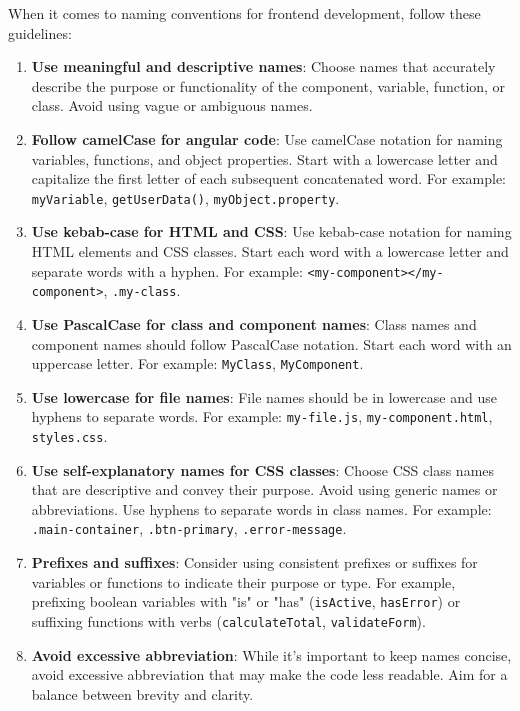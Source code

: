 \documentclass[12pt]{article}
\begin{document}
When it comes to naming conventions for frontend development, follow these guidelines:

\begin{enumerate}
    \item \textbf{Use meaningful and descriptive names}: Choose names that accurately describe the purpose or functionality of the component, variable, function, or class. Avoid using vague or ambiguous names.
    
    \item \textbf{Follow camelCase for angular code}: Use camelCase notation for naming variables, functions, and object properties. Start with a lowercase letter and capitalize the first letter of each subsequent concatenated word. For example: \texttt{myVariable}, \texttt{getUserData()}, \texttt{myObject.property}.
    
    \item \textbf{Use kebab-case for HTML and CSS}: Use kebab-case notation for naming HTML elements and CSS classes. Start each word with a lowercase letter and separate words with a hyphen. For example: \texttt{<my-component></my-component>}, \texttt{.my-class}.

    \item \textbf{Use PascalCase for class and component names}: Class names and component names should follow PascalCase notation. Start each word with an uppercase letter. For example: \texttt{MyClass}, \texttt{MyComponent}.
        
    \item \textbf{Use lowercase for file names}: File names should be in lowercase and use hyphens to separate words. For example: \texttt{my-file.js}, \texttt{my-component.html}, \texttt{styles.css}.
            
    \item \textbf{Use self-explanatory names for CSS classes}: Choose CSS class names that are descriptive and convey their purpose. Avoid using generic names or abbreviations. Use hyphens to separate words in class names. For example: \texttt{.main-container}, \texttt{.btn-primary}, \texttt{.error-message}.
    
    \item \textbf{Prefixes and suffixes}: Consider using consistent prefixes or suffixes for variables or functions to indicate their purpose or type. For example, prefixing boolean variables with "is" or "has" (\texttt{isActive}, \texttt{hasError}) or suffixing functions with verbs (\texttt{calculateTotal}, \texttt{validateForm}).
    
    \item \textbf{Avoid excessive abbreviation}: While it's important to keep names concise, avoid excessive abbreviation that may make the code less readable. Aim for a balance between brevity and clarity.
\end{enumerate}
\end{document}
